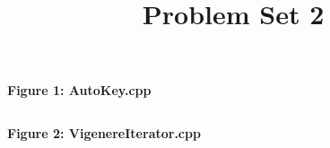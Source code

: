 \documentclass[12pt, letterpaper]{article}
\title{Problem Set 2}
\author{}
\date{}
\newcommand{\includeminted}[3]
{
  \begin{center}
  \textbf{#1}
  \vspace{-5pt}
  \inputminted[linenos, breaklines]{#2}{#3}
  \end{center}
}
\begin{document}
\normalsize
\includeminted{Figure 1: AutoKey.cpp}{cpp}{../src/AutoKey.cpp}
\clearpage
\includeminted{Figure 2: VigenereIterator.cpp}{cpp}{../src/VigenereIterator.cpp}
\end{document}
